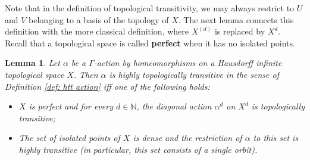 \documentclass[12pt]{article}
\numberwithin{equation}{section}
\newtheorem{lemma}[equation]{Lemma}
\theoremstyle{definition}
\def\defin#1{\textbf{#1}}
\newcommand{\N}{\mathbb{N}}
\begin{document}
Note that in the definition of topological transitivity, 
we may always restrict to \(U\) and \(V\) belonging to a basis of the topology of \(X\).
The next lemma connects this definition with the more classical definition, where 
\(X^{(d)}\) is replaced by \(X^d\). 
Recall that a topological space is called \defin{perfect}
when it has no isolated points. 

\begin{lemma}\label{lem: HTT vs HTT}
	Let \( \alpha \) be a \( \Gamma \)-action by homeomorphisms on a 
	Hausdorff infinite topological space \(X\). Then \( \alpha \) is highly topologically transitive
	in the sense of Definition \ref{def: htt action}
	iff one of the following holds:
	\begin{itemize}
		\item \(X\) is perfect and for every \( d\in\N \), the diagonal action \(\alpha^d\) on 
				\(X^d\) is topologically transitive;
		\item The set of isolated points of \(X\) is dense and the restriction of 
				\( \alpha \) to this set is highly transitive (in particular, this set consists of a single orbit).
	\end{itemize}
\end{lemma}
\end{document}
